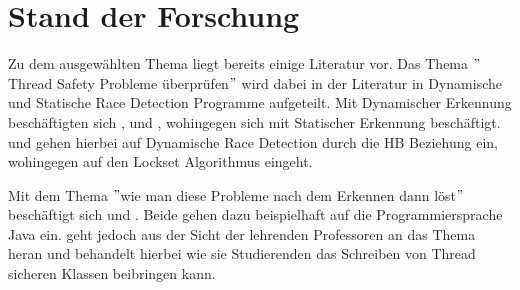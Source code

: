 \chapter{Stand der Forschung}

Zu dem ausgewählten Thema liegt bereits einige Literatur vor. Das Thema $"$Thread Safety Probleme überprüfen$"$ wird dabei in der Literatur in Dynamische und Statische Race Detection Programme aufgeteilt. Mit Dynamischer Erkennung beschäftigten sich \cite{li_efficient_2019}, \cite{erickson_effective_nodate} und \cite{savage_eraser_nodate}, wohingegen sich  \cite{relay} mit Statischer Erkennung beschäftigt. \textcite{li_efficient_2019} und \textcite{erickson_effective_nodate} gehen hierbei auf Dynamische Race Detection durch die \acs{HB} Beziehung ein, wohingegen \textcite{savage_eraser_nodate} auf den Lockset Algorithmus eingeht.

Mit dem Thema $"$wie man diese Probleme nach dem Erkennen dann löst$"$ beschäftigt sich \cite{brian} und \cite{fekete_teaching_nodate}. Beide gehen dazu beispielhaft auf die Programmiersprache Java ein. \textcite{fekete_teaching_nodate} geht jedoch aus der Sicht der lehrenden Professoren an das Thema heran und behandelt hierbei wie sie Studierenden das Schreiben von Thread sicheren Klassen beibringen kann.